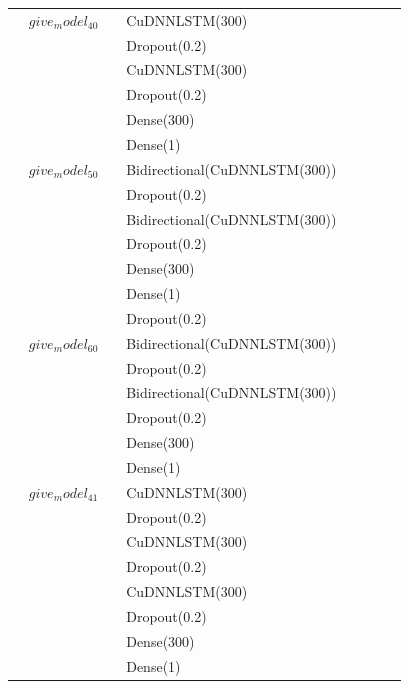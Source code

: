 \begin{longtable}{| c | m{0.58\linewidth} | r | m{0.1\linewidth} |}
    $give_model_40$                & CuDNNLSTM(300)                \\
                                   & Dropout(0.2)                  \\
                                   & CuDNNLSTM(300)                \\
                                   & Dropout(0.2)                  \\
                                   & Dense(300)                    \\
                                   & Dense(1)                      \\ \hline

    $give_model_50$                & Bidirectional(CuDNNLSTM(300)) \\
                                   & Dropout(0.2)                  \\
                                   & Bidirectional(CuDNNLSTM(300)) \\
                                   & Dropout(0.2)                  \\
                                   & Dense(300)                    \\
                                   & Dense(1)                      \\ \hline
                                   & Dropout(0.2)                  \\

    $give_model_60$                & Bidirectional(CuDNNLSTM(300)) \\
                                   & Dropout(0.2)                  \\
                                   & Bidirectional(CuDNNLSTM(300)) \\
                                   & Dropout(0.2)                  \\
                                   & Dense(300)                    \\
                                   & Dense(1)                      \\ \hline

    $give_model_41$                & CuDNNLSTM(300)                \\
                                   & Dropout(0.2)                  \\
                                   & CuDNNLSTM(300)                \\
                                   & Dropout(0.2)                  \\
                                   & CuDNNLSTM(300)                \\
                                   & Dropout(0.2)                  \\
                                   & Dense(300)                    \\
                                   & Dense(1)                      \\ \hline


\end{longtable}
